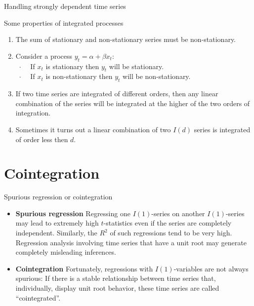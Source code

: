 \documentclass{beamer}
\begin{document}

\begin{frame}{Handling strongly dependent time series}

Some properties of integrated processes
\vspace{0.5cm}
\begin{enumerate}
\item The sum of stationary and non-stationary series must be non-stationary.
\item Consider a process $y_t=\alpha + \beta x_t$:\\
~$\cdot$~~ If $x_t$ is stationary then $y_t$ will be stationary. \\
~$\cdot$~~ If $x_t$ is non-stationary then $y_t$ will be non-stationary. 
\item If two time series are integrated of different orders, then any linear combination of the series will be integrated at the higher of the two orders of integration. 
\item Sometimes it turns out a linear combination of two $I(d)$ series is integrated of order less then $d$. 
\end{enumerate}
\end{frame}

\section{Cointegration}

\begin{frame}{Spurious regression or cointegration}
\begin{itemize}
\item \textbf{Spurious regression}
 Regressing one $I(1)$-series on another $I(1)$-series may lead to extremely
high $t$-statistics even if the series are completely independent. Similarly, the $R^2$ of such regressions tend to be very high. \\Regression analysis involving time series that have a unit root may generate completely misleading inferences.
\vspace{0.5cm}
\item \textbf{Cointegration} Fortunately, regressions with $I(1)$-variables are not always spurious:
If there is a stable relationship between time series that, individually, display unit root behavior, these time series are called ``cointegrated''.
\end{itemize}
\end{frame}
\end{document}
